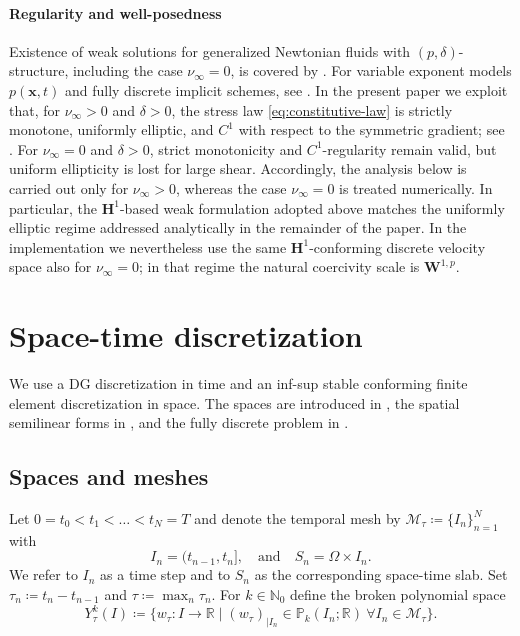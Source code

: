 \documentclass[DIV=16]{scrartcl}
\newcommand{\It}{I}
\newcommand{\In}{I_n}
\newcommand{\Sn}{S_n}
\newcommand{\Pk}{\mathbb P_k}
\newcommand{\reg}{\delta}
\newcommand{\pn}{p}
\begin{document}
\paragraph{Regularity and well-posedness}
Existence of weak solutions for generalized Newtonian fluids with
$(\pn,\reg)$-structure, including the case $\nu_\infty=0$, is covered by
\cite{DieningRuzickaWolf2010Weak}.
For variable exponent models $p(\bm x,t)$ and fully discrete implicit schemes,
see \cite{BerselliKaltenbach2025Convergence}.
In the present paper we exploit that, for $\nu_\infty>0$ and $\reg>0$, the
stress law \eqref{eq:constitutive-law} is strictly monotone, uniformly elliptic,
and $C^1$ with respect to the symmetric gradient; see
\cite{BarrettLiu1993Carreau,BarrettLiu1994Quasinorm}.
For $\nu_\infty=0$ and $\reg>0$, strict monotonicity and $C^1$-regularity
remain valid, but uniform ellipticity is lost for large shear.
Accordingly, the analysis below is carried out only for $\nu_\infty>0$, whereas
the case $\nu_\infty=0$ is treated numerically. In particular, the
$\boldsymbol H^1$-based weak formulation adopted above matches the uniformly
elliptic regime addressed analytically in the remainder of the paper. In the
implementation we nevertheless use the same $\boldsymbol H^1$-conforming
discrete velocity space also for $\nu_\infty=0$; in that regime the natural
coercivity scale is $\boldsymbol W^{1,\pn}$.


\section{Space-time discretization}
\label{sec:discretization}

We use a DG discretization in time and an inf-sup stable conforming finite
element discretization in space.
The spaces are introduced in , the spatial semilinear forms
in , and the fully discrete problem in
.

\subsection{Spaces and meshes}
\label{sec:st-spaces}

Let $0=t_0<t_1<\dots<t_N=T$ and denote the temporal mesh by
$\mathcal M_\tau\coloneq\{\In\}_{n=1}^N$ with
\begin{equation}
  \label{eq:In-Sn}
  \In=(t_{n-1},t_n],\quad\text{and}\quad\Sn=\Omega\times \In.
\end{equation}
We refer to \(\In\) as a time step and to \(\Sn\) as the corresponding
space-time slab.
Set $\tau_n\coloneq t_n-t_{n-1}$ and $\tau\coloneq\max_n\tau_n$.
For $k\in\mathbb N_0$ define the broken polynomial space
\begin{equation}
\label{eq:DefYtau}
  Y_\tau^k(\It)\coloneq
  \{w_\tau:\It\to\mathbb R \mid (w_\tau)_{|\In}\in\Pk(\In;\mathbb R)\ \forall \In\in\mathcal M_\tau\}.
\end{equation}
\end{document}
